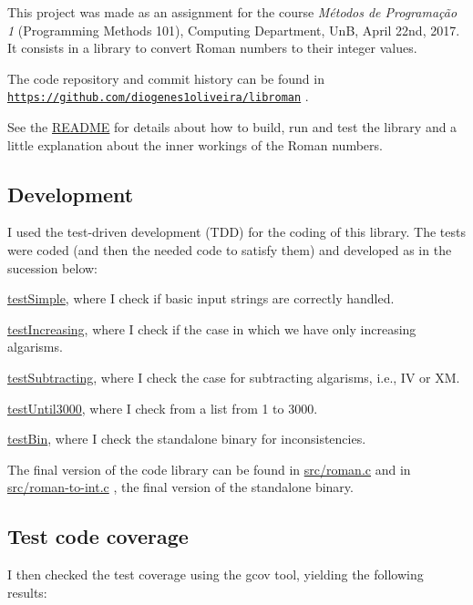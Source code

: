 This project was made as an assignment for the course {\itshape Métodos de Programação 1} (Programming Methods 101), Computing Department, UnB, April 22nd, 2017. It consists in a library to convert Roman numbers to their integer values.

The code repository and commit history can be found in \href{https://github.com/diogenes1oliveira/libroman}{\tt https\+://github.\+com/diogenes1oliveira/libroman} .

See the \hyperlink{md_README}{R\+E\+A\+D\+ME} for details about how to build, run and test the library and a little explanation about the inner workings of the Roman numbers.

\subsection*{Development }

I used the test-\/driven development (T\+DD) for the coding of this library. The tests were coded (and then the needed code to satisfy them) and developed as in the sucession below\+:


\begin{DoxyEnumerate}
\item \hyperlink{md_docs_testSimple}{test\+Simple}, where I check if basic input strings are correctly handled.
\item \hyperlink{md_docs_testIncreasing}{test\+Increasing}, where I check if the case in which we have only increasing algarisms.
\item \hyperlink{md_docs_testSubtracting}{test\+Subtracting}, where I check the case for subtracting algarisms, i.\+e., IV or XM.
\item \hyperlink{md_docs_testUntil3000}{test\+Until3000}, where I check from a list from 1 to 3000.
\item \hyperlink{md_docs_testBin}{test\+Bin}, where I check the standalone binary for inconsistencies.
\end{DoxyEnumerate}

The final version of the code library can be found in \hyperlink{roman_8c}{src/roman.\+c} and in \hyperlink{roman-to-int_8c}{src/roman-\/to-\/int.\+c} , the final version of the standalone binary.

\subsection*{Test code coverage }

I then checked the test coverage using the gcov tool, yielding the following results\+:


